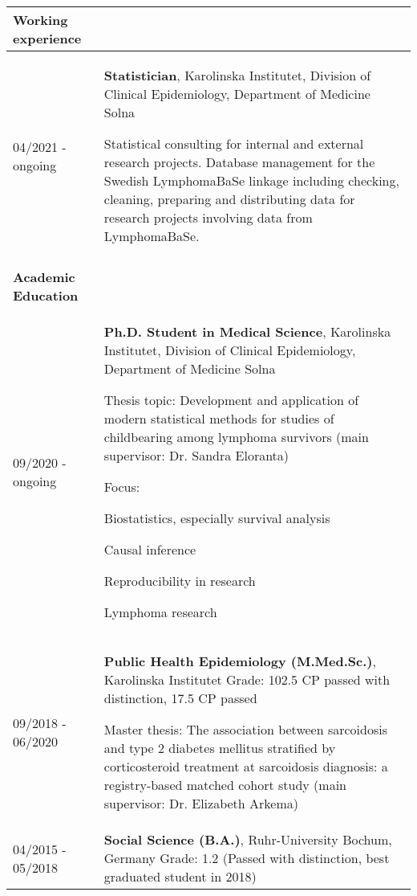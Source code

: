 \documentclass[11pt, a4paper]{article}
\begin{document}
	\begin{longtable}{p{4cm}p{12cm}}
		
		\textbf{Working experience} &
		\\ \hline
		04/2021 - ongoing 			& \textbf{Statistician}, Karolinska Institutet, Division of Clinical Epidemiology, Department of Medicine Solna \newline
		
		Statistical consulting for internal and external research projects. Database management for the Swedish LymphomaBaSe linkage including checking, cleaning, preparing and distributing data for research projects involving data from LymphomaBaSe. \\
		&							\\
		
		\textbf{Academic Education} & 	\\ \hline
		09/2020 - ongoing			& \textbf{Ph.D. Student in Medical Science}, Karolinska Institutet, Division of Clinical Epidemiology, Department of Medicine Solna \newline
		
		Thesis topic: Development and application of modern statistical methods for studies of childbearing among lymphoma survivors (main {supervisor}: Dr. Sandra Eloranta) \newline 
		
		Focus:
		\begin{compactitem}
			\item Biostatistics, especially survival analysis
			\item Causal inference
			\item Reproducibility in research
			\item Lymphoma research
		\end{compactitem} \\
		
		09/2018 - 06/2020			& \textbf{Public Health Epidemiology (M.Med.Sc.)}, Karolinska Institutet \newline
		Grade: 102.5 CP passed with distinction, 17.5 CP passed
		\newline
		
		Master thesis: The association between sarcoidosis and type 2 diabetes mellitus stratified by corticosteroid treatment at sarcoidosis diagnosis: a registry-based matched cohort study (main supervisor: Dr. Elizabeth Arkema) \newline
																						\\
		04/2015 - 05/2018			& \textbf{Social Science (B.A.)}, Ruhr-University Bochum, Germany \newline
		Grade: 1.2 (Passed with distinction, best graduated student in 2018) \newline
		

\end{longtable}
\end{document}
